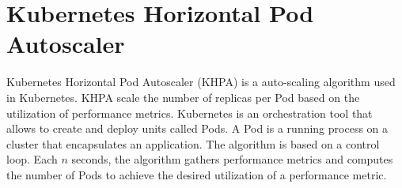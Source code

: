 \section{Kubernetes Horizontal Pod Autoscaler}
\label{sec:04_background_khpa}
Kubernetes Horizontal Pod Autoscaler (KHPA) is a auto-scaling algorithm used in Kubernetes.
KHPA scale the number of replicas per Pod based on the utilization of performance metrics.
Kubernetes is an orchestration tool that allows to create and deploy units called Pods. A Pod is a running process on a cluster that encapsulates an application.
The algorithm is based on a control loop. Each $n$ seconds, the algorithm gathers performance metrics and computes the number of Pods to achieve the desired utilization of a performance metric.
